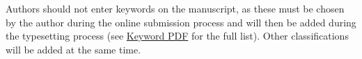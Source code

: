 \documentclass[lineno]{JFM-FLM_Au}
\begin{document}
\begin{abstract}



    \end{abstract}

    \begin{keywords}
    Authors should not enter keywords on the manuscript, as these must be chosen by the author during the online submission process and will then be added during the typesetting process (see \href{https://www.cambridge.org/core/journals/journal-of-fluid-mechanics/information/list-of-keywords}{Keyword PDF} for the full list).
    Other classifications will be added at the same time.
    \end{keywords}
\end{document}
